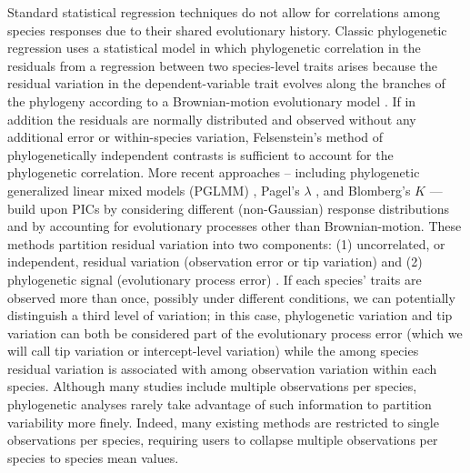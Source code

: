 \documentclass[12pt]{article}
\begin{document}
Standard statistical regression techniques do not allow for correlations among species responses due to their shared evolutionary history.
Classic phylogenetic regression uses a statistical model in which phylogenetic correlation in the residuals from a regression between two species-level traits arises because the residual variation in the dependent-variable trait evolves along the branches of the phylogeny according to a Brownian-motion evolutionary model \citep{felsenstein1985phylogenies}. 
If in addition the residuals are normally distributed and observed without any additional error or within-species variation, Felsenstein's method of phylogenetically independent contrasts  \citep[PICS:][]{felsenstein1985phylogenies, nicolakakis2000forebrain} is sufficient to account for the phylogenetic correlation.
More recent approaches -- including phylogenetic generalized linear mixed models (PGLMM) \citep{ives2011generalized, housworth2004phylogenetic}, Pagel's $\lambda$ \citep{pagel1999inferring}, and Blomberg's $K$ \citep{blomberg2003testing} --- build upon PICs by considering different (non-Gaussian) response distributions and by accounting for evolutionary processes other than Brownian-motion. 
These methods partition residual variation into two components: (1) uncorrelated, or independent, residual variation (observation error or tip variation) and (2) phylogenetic signal (evolutionary process error) \citep{hansen2012interpreting, housworth2004phylogenetic}.
If each species' traits are observed more than once, possibly under different conditions, we can potentially distinguish a third level of variation; in this case, phylogenetic variation and tip variation can both be considered part of the evolutionary process error (which we will call tip variation or intercept-level variation) while the among species residual variation is associated with among observation variation within each species.
Although many studies include multiple observations per species, phylogenetic analyses rarely take advantage of such information to partition variability more finely.
Indeed, many existing methods are restricted to single observations per species, requiring users to collapse multiple observations per species to species mean values.
\end{document}
